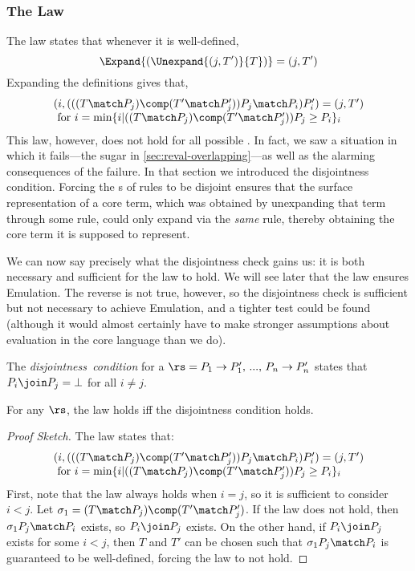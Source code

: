 \subsubsection{The {\Putget} Law}
\label{sec:reval-putget}
\label{sec:reval-disjoint}
The {\Putget} law states that whenever it is well-defined,
\[ \Expand{(\Unexpand{(j, T')}{T})} = (j, T') \]
Expanding the definitions gives that,
\[\begin{array}{lcll}
(i, (((T \match P_j) \comp (T' \match P_j'))P_j \match P_i)P_i')
  = (j, T') \\
   \text{ for $i = \text{min} \{i |
               ((T \match P_j) \comp (T' \match P_j'))P_j \geq P_i\}_i$}
\end{array}\]
This law, however, does not hold for all possible {}. In fact,
we saw a situation in which it fails---the  sugar in
\cref{sec:reval-overlapping}---as well as the alarming consequences of the
failure. In that section we introduced the disjointness condition.
Forcing the {\LHS}s of rules to be disjoint ensures that the surface
representation of a core term, which was obtained by unexpanding that term
through some rule, could only expand via the \emph{same} rule, thereby
obtaining the core term it is supposed to represent.

We can now say precisely what the disjointness check gains us: it is both
necessary and sufficient for the {\Putget} law to hold.  We will see later
that the {\Putget} law ensures Emulation. The reverse is not true, however,
so the disjointness check is sufficient but not necessary to achieve
Emulation, and a tighter test could be found (although it would almost
certainly have to make stronger assumptions about evaluation in the core
language than we do).

\begin{definition}
The \emph{disjointness~condition} for a {} $\rs = P_1 \to
P_1',\,...,\,P_n \to P_n'$ states that $P_i \join P_j = \bot$ for all
$i \neq j$.
\end{definition}

\begin{thm}
\label{thm:reval-putget}
For any {} $\rs$, the {\Putget} law holds iff the disjointness
condition holds.
\end{thm}
\begin{proof}[Proof Sketch]
The law states that:
\[\begin{array}{lcll}
(i, (((T \match P_j) \comp (T' \match P_j'))P_j \match P_i)P_i')
  = (j, T') \\
   \text{ for $i = \text{min} \{i |
               ((T \match P_j) \comp (T' \match P_j'))P_j \geq P_i\}_i$}
\end{array}\]
First, note that the law always holds when $i = j$, so it is sufficient to
consider $i < j$. Let $\sigma_1 = (T \match P_j) \comp (T' \match
P_j')$. If the {\Putget} law does not hold, then $\sigma_1 P_j \match
P_i$ exists, so $P_i \join P_j$ exists. On the other hand, if $P_i \join
P_j$ exists for some $i < j$, then $T$ and $T'$ can be chosen such that
$\sigma_1 P_j \match P_i$ is guaranteed to be well-defined, forcing the
law to not hold.
\end{proof}


